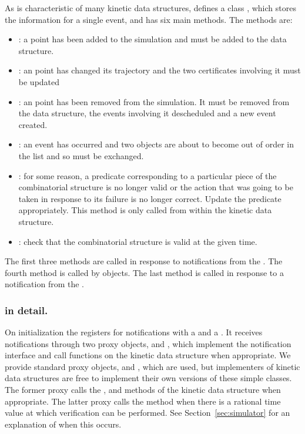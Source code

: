 As is characteristic of many kinetic data structures, 
defines a class , which stores the information for a single
event, and has six main methods. The methods are:
\begin{itemize}
\item {}: a point has been added to the simulation and
  must be added to the data structure.
\item {}: an point has changed its trajectory and the
  two certificates involving it must be updated
\item {}: an point has been removed from the
  simulation. It must be removed from the data structure, the events
  involving it descheduled and a new event created.
\item {}: an event has occurred and two objects are about to
  become out of order in the list and so must be exchanged.
\item {}: for some reason, a predicate
  corresponding to a particular piece of the combinatorial structure
  is no longer valid or the action that was going to be taken in
  response to its failure is no longer correct. Update the predicate
  appropriately. This method is only called from within the kinetic
  data structure.
\item {}: check that the combinatorial structure is
  valid at the given time.
\end{itemize}

The first three methods are called in response to notifications from
the . The fourth method is called by
 objects. The last method is called in response to a
notification from the .

\subsubsection{ in detail.}
\label{sec:sorted_impl_example}

On initialization the  registers for
notifications with a  and a . It
receives notifications through two proxy objects,
 and , which implement the
notification interface and call functions on the kinetic data
structure when appropriate. We provide standard proxy objects,
 and
, which are used, but implementers
of kinetic data structures are free to implement their own versions of
these simple classes. The former proxy calls the ,
 and
 methods of the kinetic data structure when
appropriate. The latter proxy calls the  method when there
is a rational time value at which verification can be performed. See
Section~\ref{sec:simulator} for an explanation of when this occurs.

